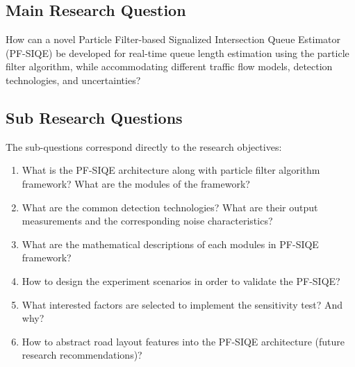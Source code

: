 \subsection{Main Research Question}
How can a novel Particle Filter-based Signalized Intersection Queue Estimator (PF-SIQE) be developed for real-time queue length estimation using the particle filter algorithm, while accommodating different traffic flow models, detection technologies, and uncertainties?


\subsection{Sub Research Questions}
The sub-questions correspond directly to the research objectives:
\begin{enumerate}
  \item What is the PF-SIQE architecture along with particle filter algorithm framework? What are the modules of the framework?
  \item What are the common detection technologies? What are their output measurements and the corresponding noise characteristics?
  \item What are the mathematical descriptions of each modules in PF-SIQE framework?
  \item How to design the experiment scenarios in order to validate the PF-SIQE?
  \item What interested factors are selected to implement the sensitivity test? And why?
  \item How to abstract road layout features into the PF-SIQE architecture (future research recommendations)?
\end{enumerate}
